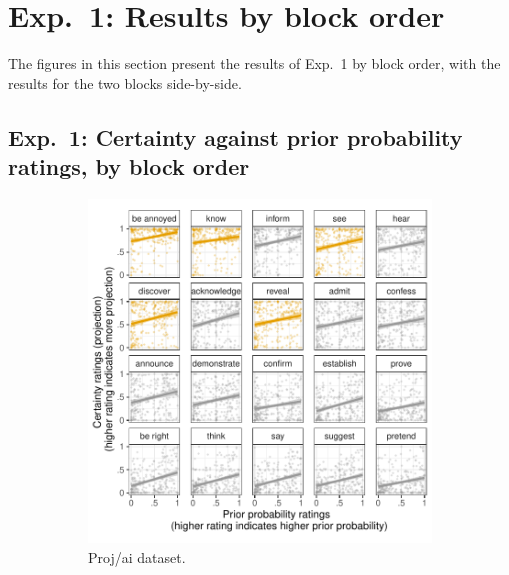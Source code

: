 \documentclass[11pt,fleqn]{article}
\newcommand{\6}{\mbox{$[\hspace*{-.6mm}[$}}
\newcommand{\9}{\mbox{$]\hspace*{-.6mm}]$}}
\begin{document}
\newpage

\section{Exp.~1: Results by block order}\label{a-blockOrderExp1}

The figures in this section present the results of Exp.~1 by block order, with the results for the two blocks side-by-side.

\subsection{Exp.~1: Certainty against prior probability ratings, by block order}

\begin{figure}[h!]
\centering
\begin{subfigure}[t]{0.49\textwidth}
\centering
\includegraphics[width=.9\textwidth]{../../results/exp1/graphs/SUP-projai-projection-by-prior}
\caption{Proj/ai dataset.}
\end{subfigure} \hfill \begin{subfigure}[t]{0.49\textwidth}
\centering

\end{subfigure}
\end{figure}
\end{document}

